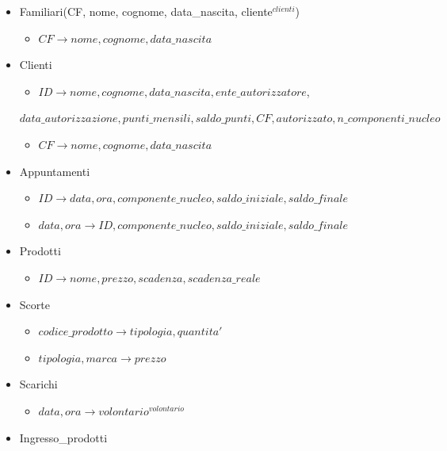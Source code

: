 \documentclass[]{article}
\providecommand{\tightlist}{%
  \setlength{\itemsep}{0pt}\setlength{\parskip}{0pt}}
\begin{document}
\begin{itemize}
\item
  Familiari(CF, nome, cognome, data\_nascita, cliente\(^{clienti}\))

  \begin{itemize}
  \tightlist
  \item
    \(CF \to nome, cognome, data\_nascita\)
  \end{itemize}
\item
  Clienti

  \begin{itemize}
  \tightlist
  \item
    \(ID \to nome, cognome, data\_nascita, ente\_autorizzatore\),
  \end{itemize}

  \(data\_autorizzazione, punti\_mensili, saldo\_punti, CF, autorizzato, n\_componenti\_nucleo\)

  \begin{itemize}
  \tightlist
  \item
    \(CF \to nome, cognome, data\_nascita\)
  \end{itemize}
\item
  Appuntamenti

  \begin{itemize}
  \tightlist
  \item
    \(ID \to data, ora, componente\_nucleo, saldo\_iniziale, saldo\_finale\)
  \item
    \(data, ora \to ID, componente\_nucleo, saldo\_iniziale, saldo\_finale\)
  \end{itemize}
\item
  Prodotti

  \begin{itemize}
  \tightlist
  \item
    \(ID \to nome, prezzo, scadenza, scadenza\_reale\)
  \end{itemize}
\item
  Scorte

  \begin{itemize}
  \tightlist
  \item
    \(codice\_prodotto \to tipologia, quantita'\)
  \item
    \(tipologia, marca \to prezzo\)
  \end{itemize}
\item
  Scarichi

  \begin{itemize}
  \tightlist
  \item
    \(data, ora \to volontario^{volontario}\)
  \end{itemize}
\item
  Ingresso\_prodotti


\end{itemize}
\end{document}
